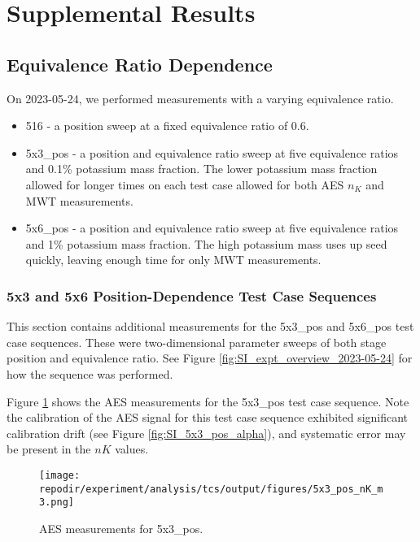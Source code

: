 \section{Supplemental Results}

\subsection{Equivalence Ratio Dependence}

On 2023-05-24, we performed measurements with a varying equivalence ratio. 

\begin{itemize}
    \item 516 - a position sweep at a fixed equivalence ratio of 0.6.
    \item 5x3\_pos - a position and equivalence ratio sweep at five equivalence ratios and 0.1\% potassium mass fraction. The lower potassium mass fraction allowed for longer times on each test case allowed for both AES $n_{K}$ and MWT measurements. 
    \item 5x6\_pos - a position and equivalence ratio sweep at five equivalence ratios and 1\% potassium mass fraction. The high potassium mass uses up seed quickly, leaving enough time for only MWT measurements. 
\end{itemize}
 
\subsubsection{5x3 and 5x6 Position-Dependence Test Case Sequences}

This section contains additional measurements for the 5x3\_pos and 5x6\_pos test case sequences. These were two-dimensional parameter sweeps of both stage position and equivalence ratio. See Figure \ref{fig:SI_expt_overview_2023-05-24} for how the sequence was performed. 

Figure \ref{fig:SI_5x3_pos_nK_m3} shows the AES measurements for the 5x3\_pos test case sequence. Note the calibration of the AES signal for this test case sequence exhibited significant calibration drift (see Figure \ref{fig:SI_5x3_pos_alpha}), and systematic error may be present in the $nK$ values. 


\begin{figure}[]
\centering
\texttt{[image: \\repodir/experiment/analysis/tcs/output/figures/5x3\_pos\_nK\_m3.png]}
\caption{AES measurements for 5x3\_pos.}
\label{fig:SI_5x3_pos_nK_m3}
\end{figure}

